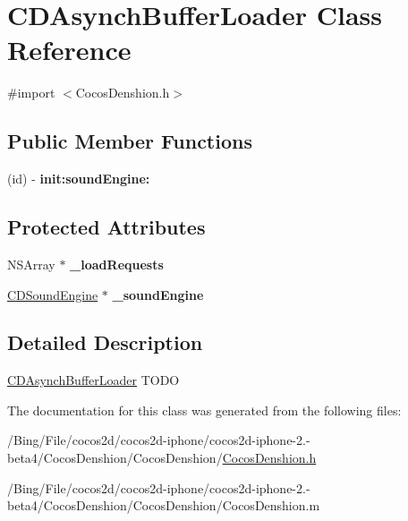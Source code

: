 \hypertarget{interface_c_d_asynch_buffer_loader}{\section{C\-D\-Asynch\-Buffer\-Loader Class Reference}
\label{interface_c_d_asynch_buffer_loader}
}


{\ttfamily \#import $<$Cocos\-Denshion.\-h$>$}

\subsection*{Public Member Functions}
\begin{DoxyCompactItemize}
\item 
\hypertarget{interface_c_d_asynch_buffer_loader_a5f32361365b87314af0524d727614fef}{(id) -\/ {\bfseries init\-:sound\-Engine\-:}}\label{interface_c_d_asynch_buffer_loader_a5f32361365b87314af0524d727614fef}

\end{DoxyCompactItemize}
\subsection*{Protected Attributes}
\begin{DoxyCompactItemize}
\item 
\hypertarget{interface_c_d_asynch_buffer_loader_a2eaa5cb53e91383803e96f9fdf5d554c}{N\-S\-Array $\ast$ {\bfseries \-\_\-load\-Requests}}\label{interface_c_d_asynch_buffer_loader_a2eaa5cb53e91383803e96f9fdf5d554c}

\item 
\hypertarget{interface_c_d_asynch_buffer_loader_abcb583735cd68e5f5aa0999b7e692262}{\hyperlink{interface_c_d_sound_engine}{C\-D\-Sound\-Engine} $\ast$ {\bfseries \-\_\-sound\-Engine}}\label{interface_c_d_asynch_buffer_loader_abcb583735cd68e5f5aa0999b7e692262}

\end{DoxyCompactItemize}


\subsection{Detailed Description}
\hyperlink{interface_c_d_asynch_buffer_loader}{C\-D\-Asynch\-Buffer\-Loader} T\-O\-D\-O 

The documentation for this class was generated from the following files\-:\begin{DoxyCompactItemize}
\item 
/\-Bing/\-File/cocos2d/cocos2d-\/iphone/cocos2d-\/iphone-\/2.-\/beta4/\-Cocos\-Denshion/\-Cocos\-Denshion/\hyperlink{_cocos_denshion_8h}{Cocos\-Denshion.\-h}\item 
/\-Bing/\-File/cocos2d/cocos2d-\/iphone/cocos2d-\/iphone-\/2.-\/beta4/\-Cocos\-Denshion/\-Cocos\-Denshion/Cocos\-Denshion.\-m\end{DoxyCompactItemize}
